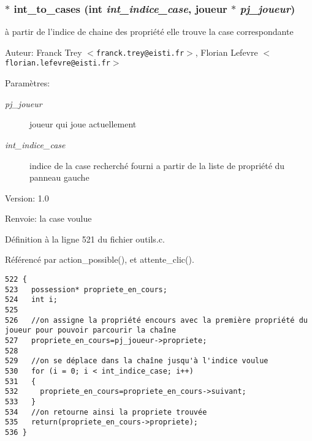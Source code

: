 \subsubsection{$\ast$ int\_\-to\_\-cases (int {\em int\_\-indice\_\-case}, {\bf joueur} $\ast$ {\em pj\_\-joueur})}\label{outils_8h_564f1b7b3845867298d667c4811cbff3}


\`{a} partir de l'indice de chaine des propri\'{e}t\'{e} elle trouve la case correspondante 

\begin{Desc}
\item[Auteur:]Franck Trey $<${\tt franck.trey@eisti.fr}$>$, Florian Lefevre $<${\tt florian.lefevre@eisti.fr}$>$\end{Desc}
\begin{Desc}
\item[Param\`{e}tres:]
\begin{description}
\item[{\em pj\_\-joueur}]joueur qui joue actuellement \item[{\em int\_\-indice\_\-case}]indice de la case recherch\'{e} fourni a partir de la liste de propri\'{e}t\'{e} du panneau gauche\end{description}
\end{Desc}
\begin{Desc}
\item[Version:]1.0 \end{Desc}
\begin{Desc}
\item[Renvoie:]la case voulue \end{Desc}


D\'{e}finition \`{a} la ligne 521 du fichier outils.c.

R\'{e}f\'{e}renc\'{e} par action\_\-possible(), et attente\_\-clic().

\begin{Code}\begin{verbatim}522 {
523   possession* propriete_en_cours;
524   int i;
525   
526   //on assigne la propriété encours avec la première propriété du joueur pour pouvoir parcourir la chaîne
527   propriete_en_cours=pj_joueur->propriete;
528   
529   //on se déplace dans la chaîne jusqu'à l'indice voulue
530   for (i = 0; i < int_indice_case; i++)
531   {
532     propriete_en_cours=propriete_en_cours->suivant;
533   }
534   //on retourne ainsi la propriete trouvée
535   return(propriete_en_cours->propriete);
536 }
\end{verbatim}\end{Code}


